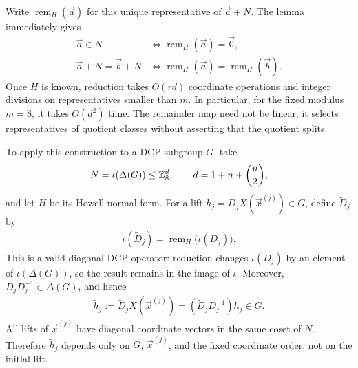 Write $\operatorname{rem}_H(\vec{a})$ for this
unique representative of $\vec{a}+N$.
The lemma immediately gives
\begin{align}
    \vec{a}\in N
    &\iff \operatorname{rem}_H(\vec{a})=\vec{0},
    \\
    \vec{a}+N=\vec{b}+N
    &\iff
    \operatorname{rem}_H(\vec{a})
    =\operatorname{rem}_H(\vec{b}).
\end{align}
Once $H$ is known, reduction takes $O(rd)$
coordinate operations and integer divisions on
representatives smaller than $m$.
In particular, for the fixed modulus $m=8$, it
takes $O(d^2)$ time. The remainder map need not
be linear; it selects representatives of quotient
classes without asserting that the quotient splits.

To apply this construction to a DCP subgroup $G$,
take
\begin{align}
    N=\iota(\Delta(G))\leq\mathbb{Z}_8^d,
    \qquad d=1+n+\binom{n}{2},
\end{align}
and let $H$ be its Howell normal form.
For a lift $h_j=D_jX(\vec{x}^{(j)})\in G$, define
$\widetilde{D}_j$ by
\begin{align}
    \iota(\widetilde{D}_j)
    =
    \operatorname{rem}_H\big(\iota(D_j)\big).
\end{align}
This is a valid diagonal DCP operator: reduction
changes $\iota(D_j)$ by an element of
$\iota(\Delta(G))$, so the result remains in the
image of $\iota$. Moreover,
$\widetilde{D}_jD_j^{-1}\in\Delta(G)$, and hence
\begin{align}
    \widetilde{h}_j
    :=
    \widetilde{D}_jX(\vec{x}^{(j)})
    =
    (\widetilde{D}_jD_j^{-1})h_j
    \in G.
\end{align}
All lifts of $\vec{x}^{(j)}$ have diagonal coordinate
vectors in the same coset of $N$. Therefore
$\widetilde{h}_j$ depends only on $G$, $\vec{x}^{(j)}$,
and the fixed coordinate order, not on the
initial lift.
